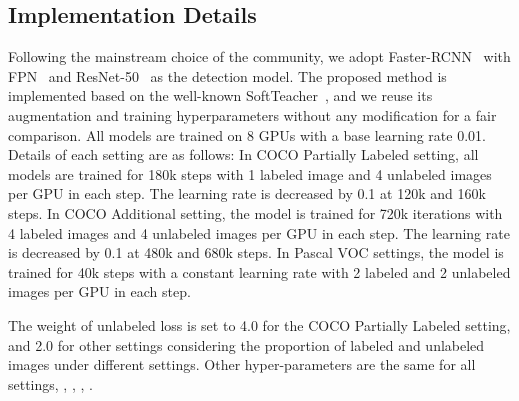 \documentclass[10pt,twocolumn,letterpaper]{article}
\begin{document}
\begin{table}[t]
    \centering
\vspace{-.5em}
\caption{Experimental results on the COCO Partially Labeled with FCOS~\cite{fcos}. PLM is not used for our method in this setting.}
\label{tab:fcos}
\vspace{-1em}
\end{table}

\subsection{Implementation Details}
Following the mainstream choice of the community, we adopt Faster-RCNN~\cite{faster} with FPN~\cite{fpn} and ResNet-50~\cite{resnet} as the detection model.
The proposed method is implemented based on the well-known SoftTeacher~\cite{softTeacher}, and we reuse its augmentation and training hyperparameters without any modification for a fair comparison.
All models are trained on 8 GPUs with a base learning rate 0.01. Details of each setting are as follows: In COCO Partially Labeled setting, all models are trained for 180k steps with 1 labeled image and 4 unlabeled images per GPU in each step. The learning rate is decreased by 0.1 at 120k and 160k steps.
In COCO Additional setting, the model is trained for 720k iterations with 4 labeled images and 4 unlabeled images per GPU in each step. The learning rate is decreased by 0.1 at 480k and 680k steps.
In Pascal VOC settings, the model is trained for 40k steps with a constant learning rate with 2 labeled and 2 unlabeled images per GPU in each step.

The weight of unlabeled loss  is set to 4.0 for the COCO Partially Labeled setting, and 2.0 for other settings considering the proportion of labeled and unlabeled images under different settings. Other hyper-parameters are the same for all settings, \ie , , , .
\end{document}

